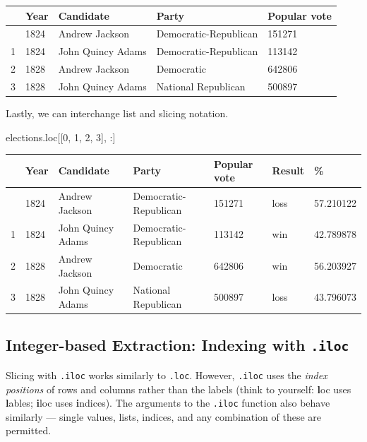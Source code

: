 \documentclass[
  letterpaper,
  DIV=11,
  numbers=noendperiod]{scrreprt}
\newenvironment{Shaded}{\begin{snugshade}}{\end{snugshade}}
\newcommand{\DecValTok}[1]{\textcolor[rgb]{0.68,0.00,0.00}{#1}}
\newcommand{\NormalTok}[1]{\textcolor[rgb]{0.00,0.23,0.31}{#1}}
\begin{document}
\begin{longtable}[]{@{}lllll@{}}
\toprule\noalign{}
& Year & Candidate & Party & Popular vote \\
\midrule\noalign{}
\endhead
\bottomrule\noalign{}
\endlastfoot
0 & 1824 & Andrew Jackson & Democratic-Republican & 151271 \\
1 & 1824 & John Quincy Adams & Democratic-Republican & 113142 \\
2 & 1828 & Andrew Jackson & Democratic & 642806 \\
3 & 1828 & John Quincy Adams & National Republican & 500897 \\
\end{longtable}

Lastly, we can interchange list and slicing notation.

\begin{Shaded}
\begin{Highlighting}[]
\NormalTok{elections.loc[[}\DecValTok{0}\NormalTok{, }\DecValTok{1}\NormalTok{, }\DecValTok{2}\NormalTok{, }\DecValTok{3}\NormalTok{], :]}
\end{Highlighting}
\end{Shaded}

\begin{longtable}[]{@{}lllllll@{}}
\toprule\noalign{}
& Year & Candidate & Party & Popular vote & Result & \% \\
\midrule\noalign{}
\endhead
\bottomrule\noalign{}
\endlastfoot
0 & 1824 & Andrew Jackson & Democratic-Republican & 151271 & loss &
57.210122 \\
1 & 1824 & John Quincy Adams & Democratic-Republican & 113142 & win &
42.789878 \\
2 & 1828 & Andrew Jackson & Democratic & 642806 & win & 56.203927 \\
3 & 1828 & John Quincy Adams & National Republican & 500897 & loss &
43.796073 \\
\end{longtable}

\subsection{\texorpdfstring{Integer-based Extraction: Indexing with
\texttt{.iloc}}{Integer-based Extraction: Indexing with .iloc}}\label{integer-based-extraction-indexing-with-.iloc}

Slicing with \texttt{.iloc} works similarly to \texttt{.loc}. However,
\texttt{.iloc} uses the \emph{index positions} of rows and columns
rather than the labels (think to yourself: \textbf{l}oc uses
\textbf{l}ables; \textbf{i}loc uses \textbf{i}ndices). The arguments to
the \texttt{.iloc} function also behave similarly --- single values,
lists, indices, and any combination of these are permitted.
\end{document}
